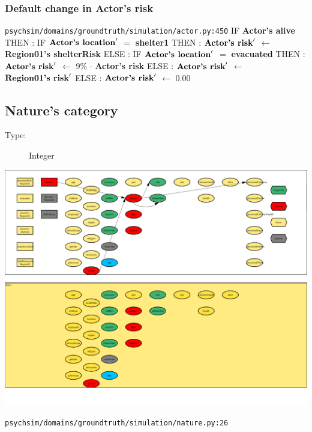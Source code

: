 \documentclass{article}%
\begin{document}
%
\subsubsection{Default change in Actor's risk}%
\label{ssubsec:Default change in Actor's risk}%
\begin{flushleft}%
\verb|psychsim/domains/groundtruth/simulation/actor.py:450|%
\linebreak%
IF %
\textbf{Actor's alive}%
\linebreak%
\hspace*{2em}%
THEN %
: %
IF %
$\mbox{\textbf{Actor's location}} '$%
$=$%
\textbf{shelter1}%
\linebreak%
\hspace*{4em}%
THEN %
: %
$\mbox{\textbf{Actor's risk}} '$%
$\leftarrow$%
\textbf{Region01's shelterRisk}%
\linebreak%
\hspace*{4em}%
ELSE %
: %
IF %
$\mbox{\textbf{Actor's location}} '$%
$=$%
\textbf{evacuated}%
\linebreak%
\hspace*{6em}%
THEN %
: %
$\mbox{\textbf{Actor's risk}} '$%
$\leftarrow$%
9\%%
$\cdot$%
\textbf{Actor's risk}%
\linebreak%
\hspace*{6em}%
ELSE %
: %
$\mbox{\textbf{Actor's risk}} '$%
$\leftarrow$%
$\mbox{\textbf{Region01's risk}} '$%
\linebreak%
\hspace*{2em}%
ELSE %
: %
$\mbox{\textbf{Actor's risk}} '$%
$\leftarrow$%
0.00%
\end{flushleft}

%
\subsection{Nature's category}%
\label{subsec:Nature's category}%
\begin{description}%
\item[Type:]%
Integer%
\end{description}%
\includegraphics[width=\textwidth]{images/categoryOfNature.png}%
\begin{flushleft}%
\verb|psychsim/domains/groundtruth/simulation/nature.py:26|%
\end{flushleft}%
\end{document}
